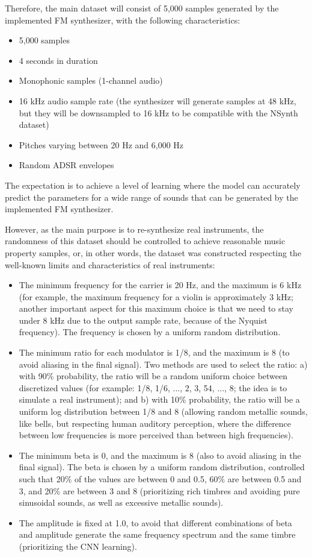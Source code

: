 \documentclass[sigconf,natbib=false]{acmart}
\begin{document}
Therefore, the main dataset will consist of 5,000 samples generated by the implemented FM synthesizer, with the following characteristics:

\begin{itemize}
\item 5,000 samples
\item 4 seconds in duration
\item Monophonic samples (1-channel audio)
\item 16 kHz audio sample rate (the synthesizer will generate samples at 48 kHz, but they will be downsampled to 16 kHz to be compatible with the NSynth dataset)
\item Pitches varying between 20 Hz and 6,000 Hz
\item Random ADSR envelopes
\end{itemize}

The expectation is to achieve a level of learning where the model can accurately predict the parameters for a wide range of sounds that can be generated by the implemented FM synthesizer.

However, as the main purpose is to re-synthesize real instruments, the randomness of this dataset should be controlled to achieve reasonable music property samples, or, in other words, the dataset was constructed respecting the well-known limits and characteristics of real instruments:

\begin{itemize}
\item The minimum frequency for the carrier is 20 Hz, and the maximum is 6 kHz (for example, the maximum frequency for a violin is approximately 3 kHz; another important aspect for this maximum choice is that we need to stay under 8 kHz due to the output sample rate, because of the Nyquist frequency). The frequency is chosen by a uniform random distribution.
\item The minimum ratio for each modulator is 1/8, and the maximum is 8 (to avoid aliasing in the final signal). Two methods are used to select the ratio: a) with 90\% probability, the ratio will be a random uniform choice between discretized values (for example: 1/8, 1/6, ..., 2, 3, 54, ..., 8; the idea is to simulate a real instrument); and b) with 10\% probability, the ratio will be a uniform log distribution between 1/8 and 8 (allowing random metallic sounds, like bells, but respecting human auditory perception, where the difference between low frequencies is more perceived than between high frequencies).
\item The minimum beta is 0, and the maximum is 8 (also to avoid aliasing in the final signal). The beta is chosen by a uniform random distribution, controlled such that 20\% of the values are between 0 and 0.5, 60\% are between 0.5 and 3, and 20\% are between 3 and 8 (prioritizing rich timbres and avoiding pure sinusoidal sounds, as well as excessive metallic sounds).
\item The amplitude is fixed at 1.0, to avoid that different combinations of beta and amplitude generate the same frequency spectrum and the same timbre (prioritizing the CNN learning).
\end{itemize}
\end{document}

